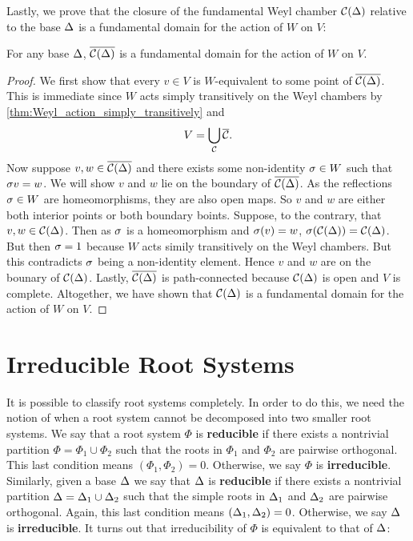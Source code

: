 \documentclass[12pt,reqno,oneside]{amsart}
\begin{document}
    Lastly, we prove that the closure of the fundamental Weyl chamber $\mathcal{C}(\Delta)$ relative to the base $\Delta$ is a fundamental domain for the action of $W$ on $V$:

    \begin{proposition}\label{prop:fundamental_domain}
        For any base $\Delta$, $\overline{\mathcal{C}(\Delta)}$ is a fundamental domain for the action of $W$ on $V$.
    \end{proposition}
    \begin{proof}
        We first show that every $v \in V$ is $W$-equivalent to some point of $\overline{\mathcal{C}(\Delta)}$. This is immediate since $W$ acts simply transitively on the Weyl chambers by \cref{thm:Weyl_action_simply_transitively} and
        \[
            V = \bigcup_{\mathcal{C}}\overline{\mathcal{C}}.
        \]
        Now suppose $v,w \in \overline{\mathcal{C}(\Delta)}$ and there exists some non-identity $\sigma \in W$ such that $\sigma v = w$. We will show $v$ and $w$ lie on the boundary of $\overline{\mathcal{C}(\Delta)}$. As the reflections $\sigma \in W$ are homeomorphisms, they are also open maps. So $v$ and $w$ are either both interior points or both boundary boints. Suppose, to the contrary, that $v,w \in \mathcal{C}(\Delta)$. Then as $\sigma$ is a homeomorphism and $\sigma(v) = w$, $\sigma(\mathcal{C}(\Delta)) = \mathcal{C}(\Delta)$. But then $\sigma = 1$ because $W$ acts simily transitively on the Weyl chambers. But this contradicts $\sigma$ being a non-identity element. Hence $v$ and $w$ are on the bounary of $\mathcal{C}(\Delta)$. Lastly, $\overline{\mathcal{C}(\Delta)}$ is path-connected because $\mathcal{C}(\Delta)$ is open and $V$ is complete. Altogether, we have shown that $\mathcal{C}(\Delta)$ is a fundamental domain for the action of $W$ on $V$.
    \end{proof}
\section{Irreducible Root Systems}
    It is possible to classify root systems completely. In order to do this, we need the notion of when a root system cannot be decomposed into two smaller root systems. We say that a root system $\Phi$ is \textbf{reducible} if there exists a nontrivial partition $\Phi = \Phi_{1} \cup \Phi_{2}$ such that the roots in $\Phi_{1}$ and $\Phi_{2}$ are pairwise orthogonal. This last condition means $(\Phi_{1},\Phi_{2}) = 0$. Otherwise, we say $\Phi$ is \textbf{irreducible}. Similarly, given a base $\Delta$ we say that $\Delta$ is \textbf{reducible} if there exists a nontrivial partition $\Delta = \Delta_{1} \cup \Delta_{2}$ such that the simple roots in $\Delta_{1}$ and $\Delta_{2}$ are pairwise orthogonal. Again, this last condition means $(\Delta_{1},\Delta_{2}) = 0$. Otherwise, we say $\Delta$ is \textbf{irreducible}. It turns out that irreducibility of $\Phi$ is equivalent to that of $\Delta$:
    
\end{document}
